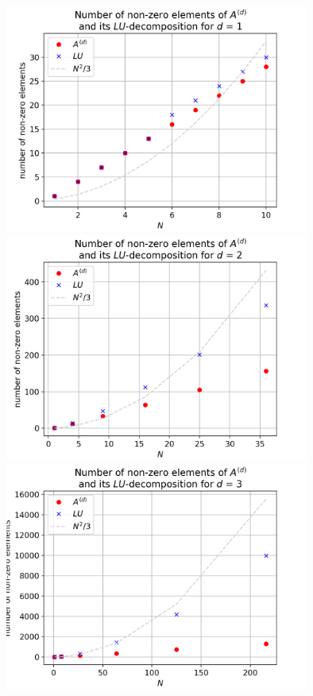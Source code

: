 \documentclass{scrartcl}
\begin{document}
{
  \centering
    \includegraphics[width=0.75\textwidth]{Grafiken/non-zero_d1}
    \includegraphics[width=0.75\textwidth]{Grafiken/non-zero_d2}
    \includegraphics[width=0.75\textwidth]{Grafiken/non-zero_d3}
    \vspace{-0.2cm}
}
\vspace{0.5cm}
\end{document}
